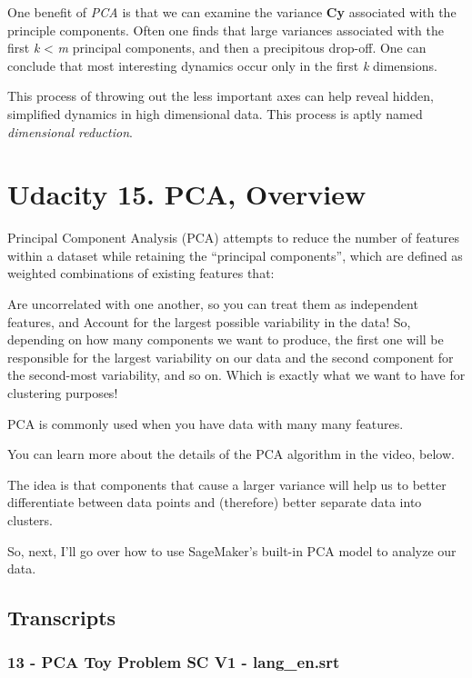 One benefit of \emph{PCA} is that we can examine the variance
\textbf{Cy} associated with the principle components. Often one finds
that large variances associated with the first \emph{k} \textless{}
\emph{m} principal components, and then a precipitous drop-off. One can
conclude that most interesting dynamics occur only in the first \emph{k}
dimensions.

This process of throwing out the less important axes can help reveal
hidden, simplified dynamics in high dimensional data. This process is
aptly named \emph{dimensional reduction}.

\hypertarget{udacity-15.-pca-overview}{%
\section{Udacity 15. PCA, Overview}\label{udacity-15.-pca-overview}}

Principal Component Analysis (PCA) attempts to reduce the number of
features within a dataset while retaining the ``principal components'',
which are defined as weighted combinations of existing features that:

Are uncorrelated with one another, so you can treat them as independent
features, and Account for the largest possible variability in the data!
So, depending on how many components we want to produce, the first one
will be responsible for the largest variability on our data and the
second component for the second-most variability, and so on. Which is
exactly what we want to have for clustering purposes!

PCA is commonly used when you have data with many many features.

You can learn more about the details of the PCA algorithm in the video,
below.

The idea is that components that cause a larger variance will help us to
better differentiate between data points and (therefore) better separate
data into clusters.

So, next, I'll go over how to use SageMaker's built-in PCA model to
analyze our data.

\hypertarget{transcripts}{%
\subsection{Transcripts}\label{transcripts}}

\hypertarget{pca-toy-problem-sc-v1---lang_en.srt}{%
\subsubsection{13 - PCA Toy Problem SC V1 -
lang\_en.srt}\label{pca-toy-problem-sc-v1---lang_en.srt}}

